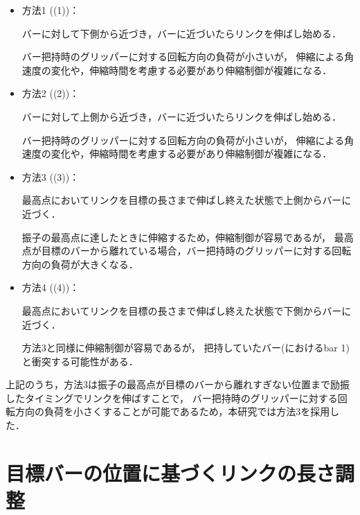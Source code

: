         \begin{itemize}
        \item 方法1 ((1))：
        
        バーに対して下側から近づき，バーに近づいたらリンクを伸ばし始める．

        バー把持時のグリッパーに対する回転方向の負荷が小さいが，
        伸縮による角速度の変化や，伸縮時間を考慮する必要があり伸縮制御が複雑になる．
        
        \item 方法2 ((2))：
        
        バーに対して上側から近づき，バーに近づいたらリンクを伸ばし始める．
        
        バー把持時のグリッパーに対する回転方向の負荷が小さいが，
        伸縮による角速度の変化や，伸縮時間を考慮する必要があり伸縮制御が複雑になる．

        \item 方法3 ((3))：
        
        最高点においてリンクを目標の長さまで伸ばし終えた状態で上側からバーに近づく．
        
        振子の最高点に達したときに伸縮するため，伸縮制御が容易であるが，
        最高点が目標のバーから離れている場合，バー把持時のグリッパーに対する回転方向の負荷が大きくなる．
        
        \item 方法4 ((4))：
        
        最高点においてリンクを目標の長さまで伸ばし終えた状態で下側からバーに近づく．

        方法3と同様に伸縮制御が容易であるが，
        把持していたバー(におけるbar 1)と衝突する可能性がある．

        \end{itemize}

        上記のうち，方法3は振子の最高点が目標のバーから離れすぎない位置まで励振したタイミングでリンクを伸ばすことで，
        バー把持時のグリッパーに対する回転方向の負荷を小さくすることが可能であるため，本研究では方法3を採用した．



        \section{目標バーの位置に基づくリンクの長さ調整}

